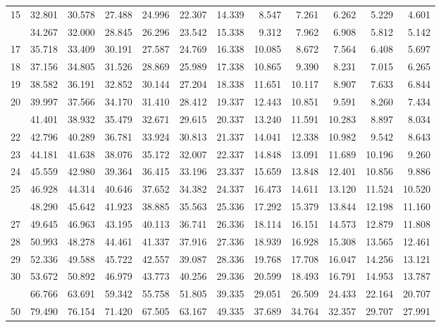 \documentclass[
]{article}
\begin{document}
\begin{longtable}[t]{lrrrrrrrrrrr}
15 & 32.801 & 30.578 & 27.488 & 24.996 & 22.307 & 14.339 & 8.547 & 7.261 & 6.262 & 5.229 & 4.601\\
\addlinespace
16 & 34.267 & 32.000 & 28.845 & 26.296 & 23.542 & 15.338 & 9.312 & 7.962 & 6.908 & 5.812 & 5.142\\
17 & 35.718 & 33.409 & 30.191 & 27.587 & 24.769 & 16.338 & 10.085 & 8.672 & 7.564 & 6.408 & 5.697\\
18 & 37.156 & 34.805 & 31.526 & 28.869 & 25.989 & 17.338 & 10.865 & 9.390 & 8.231 & 7.015 & 6.265\\
19 & 38.582 & 36.191 & 32.852 & 30.144 & 27.204 & 18.338 & 11.651 & 10.117 & 8.907 & 7.633 & 6.844\\
20 & 39.997 & 37.566 & 34.170 & 31.410 & 28.412 & 19.337 & 12.443 & 10.851 & 9.591 & 8.260 & 7.434\\
\addlinespace
21 & 41.401 & 38.932 & 35.479 & 32.671 & 29.615 & 20.337 & 13.240 & 11.591 & 10.283 & 8.897 & 8.034\\
22 & 42.796 & 40.289 & 36.781 & 33.924 & 30.813 & 21.337 & 14.041 & 12.338 & 10.982 & 9.542 & 8.643\\
23 & 44.181 & 41.638 & 38.076 & 35.172 & 32.007 & 22.337 & 14.848 & 13.091 & 11.689 & 10.196 & 9.260\\
24 & 45.559 & 42.980 & 39.364 & 36.415 & 33.196 & 23.337 & 15.659 & 13.848 & 12.401 & 10.856 & 9.886\\
25 & 46.928 & 44.314 & 40.646 & 37.652 & 34.382 & 24.337 & 16.473 & 14.611 & 13.120 & 11.524 & 10.520\\
\addlinespace
26 & 48.290 & 45.642 & 41.923 & 38.885 & 35.563 & 25.336 & 17.292 & 15.379 & 13.844 & 12.198 & 11.160\\
27 & 49.645 & 46.963 & 43.195 & 40.113 & 36.741 & 26.336 & 18.114 & 16.151 & 14.573 & 12.879 & 11.808\\
28 & 50.993 & 48.278 & 44.461 & 41.337 & 37.916 & 27.336 & 18.939 & 16.928 & 15.308 & 13.565 & 12.461\\
29 & 52.336 & 49.588 & 45.722 & 42.557 & 39.087 & 28.336 & 19.768 & 17.708 & 16.047 & 14.256 & 13.121\\
30 & 53.672 & 50.892 & 46.979 & 43.773 & 40.256 & 29.336 & 20.599 & 18.493 & 16.791 & 14.953 & 13.787\\
\addlinespace
40 & 66.766 & 63.691 & 59.342 & 55.758 & 51.805 & 39.335 & 29.051 & 26.509 & 24.433 & 22.164 & 20.707\\
50 & 79.490 & 76.154 & 71.420 & 67.505 & 63.167 & 49.335 & 37.689 & 34.764 & 32.357 & 29.707 & 27.991\\

\end{longtable}
\end{document}
